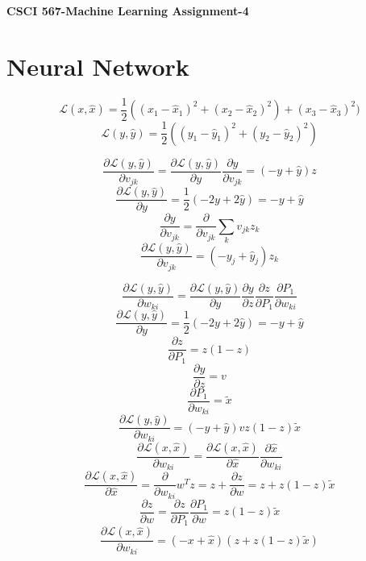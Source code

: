 \documentclass[letter,11pt]{article}
\begin{document}
	\begin{center}
		\Large\textbf{CSCI 567-Machine Learning Assignment-4}
	\end{center}
	
	\section{Neural Network}
	\begin{equation}
	\mathcal{L}(x,\hat{x}) = \frac{1}{2}((x_1 - \hat{x}_1)^2 + (x_2 - \hat{x}_2)^2) + (x_3 - \hat{x}_3)^2)
	\end{equation}
	\begin{equation}
	\mathcal{L}(y,\hat{y}) = \frac{1}{2}((y_1 - \hat{y}_1)^2 + (y_2 - \hat{y}_2)^2)
	\end{equation}
	
	$$ \frac{\partial \mathcal{L}(y,\hat{y})}{\partial v_{jk}} =   \frac{\partial \mathcal{L}(y,\hat{y})}{\partial y}   \frac{\partial y}{\partial v_{jk}} = (-y + \hat{y})z $$
	$$  \frac{\partial \mathcal{L}(y,\hat{y})}{\partial y} = \frac{1}{2} (-2y + 2\hat{y}) = -y + \hat{y}$$
	$$ \frac{\partial y}{\partial v_{jk}} = \frac{\partial}{\partial v_{jk}} \sum_{k} v_{jk}z_k$$
	\begin{equation}
	\frac{\partial \mathcal{L}(y,\hat{y})}{\partial v_{jk}} =(-y_j + \hat{y}_j)z_k
	\end{equation}
	
	$$\frac{\partial \mathcal{L}(y,\hat{y})}{\partial w_{ki}} =  \frac{\partial \mathcal{L}(y,\hat{y})}{\partial y} \frac{\partial y}{\partial z} \frac{\partial z}{\partial P_1} \frac{\partial P_1}{\partial w_{ki}}$$ 
	$$  \frac{\partial \mathcal{L}(y,\hat{y})}{\partial y} = \frac{1}{2} (-2y + 2\hat{y}) = -y + \hat{y}$$
	$$  \frac{\partial z}{\partial P_1} = z(1-z)$$
	$$ \frac{\partial y}{\partial z} = v $$
	$$ \frac{\partial P_1}{\partial w_{ki}} = \tilde{x}$$
    \begin{equation}
	\frac{\partial \mathcal{L}(y,\hat{y})}{\partial w_{ki}} = (-y + \hat{y})vz(1-z)\tilde{x}
	\end{equation}
	$$\frac{\partial \mathcal{L}(x,\hat{x})}{\partial w_{ki}} =  \frac{\partial \mathcal{L}(x,\hat{x})}{\partial \hat{x}} \frac{\partial \hat{x}}{\partial w_{ki}}$$ 		
    $$  \frac{\partial \mathcal{L}(x,\hat{x})}{\partial \hat{x}} = \frac{\partial}{\partial w_{ki}} w^Tz = z + \frac{\partial z}{\partial w} = z + z(1-z) \tilde{x} $$
    $$ \frac{\partial z}{\partial w} = \frac{\partial z}{\partial P_1} \frac{\partial P_1}{\partial w} = z(1-z)\tilde{x}$$
    \begin{equation}
    \frac{\partial \mathcal{L}(x,\hat{x})}{\partial w_{ki}} = (-x + \hat{x})(z+z(1-z)\tilde{x})
    \end{equation}
        
\end{document}
